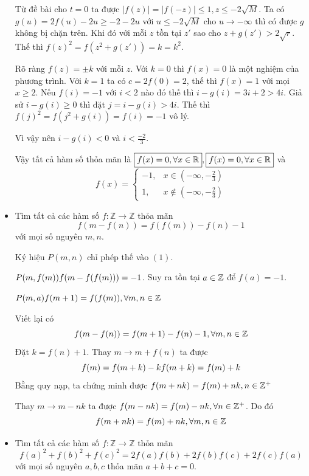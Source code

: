 \documentclass[11pt]{scrartcl}
\begin{document}
\begin{itemize}[label=, leftmargin=0em, itemsep=0.5em]
\begin{sol}
        Từ đề bài cho $t = 0$ ta được $|f(z)| = |f(-z)| \leq 1, z \leq -2\sqrt{M}$. Ta có $g(u) = 2f(u) - 2u \geq - 2-2u$ với $u \leq -2\sqrt{M}$ cho $u \to -\infty$ thì có được $g$ không bị chặn trên. Khi đó với mỗi $z$ tồn tại $z'$ sao cho $z + g(z') > 2\sqrt{r}$. Thế thì $f(z)^2 = f(z^2 + g(z')) = k = k^2$. 
        
        Rõ ràng $f(z) = \pm k$ với mỗi $z$. Với $k = 0$ thì $f(x) = 0$ là một nghiệm của phương trình. Với $k = 1$ ta có $c = 2f(0) = 2$, thế thì $f(x) = 1$ với mọi $x \geq 2$. Nếu $f(i) = - 1$ với $i < 2$ nào đó thế thì $i - g(i) = 3i + 2> 4i$. Giả sử $i - g(i) \geq 0$ thì đặt $j = i -g(i) > 4i$. Thế thì $f(j)^2 = f(j^2 + g(i)) = f(i) = -1$ vô lý. 
        
        Vì vậy nên $i - g(i) < 0$ và $i < \frac{-2}{3}$. 
        
        Vậy tất cả hàm số thỏa mãn là $\boxed{f(x) = 0 ,\forall x\in \mathbb{R}}, \boxed{f(x) = 0 ,\forall x\in \mathbb{R}}$ và 
        \[\boxed{ f(x)=
        \left\{\begin{array}{rr}-1,&x\in \left(-\infty,-\frac{2}{3}\right)\\
            1,&x\not\in \left(-\infty,-\frac{2}{3}\right)
        \end{array}
        \right.
        }
        \]
    \end{sol}
    \item \begin{bt}
        Tìm tất cả các hàm số $f: \mathbb{Z}\to \mathbb{Z}$ thỏa mãn
        \[
           f(m - f(n))  = f(f( m)) - f(n) -1\tag{1}
        \]
        với mọi số nguyên $m,n$.
    \end{bt}
    \begin{sol}
        Ký hiệu $P(m,n)$ chỉ phép thế vào $(1)$. 

        $P(m,f(m)) \ra f(m - f(f(m))) = -1$. Suy ra tồn tại $a \in \mathbb{Z}$ để $f(a) = -1$. 

        $P(m,a) \ra f(m + 1) = f(f(m)),\forall m,n\in \bb{Z}$

        Viết lại có 
        \[
            f(m - f(n)) = f( m + 1) -f(n) - 1, \forall m,n \in \mathbb{Z}
        \]
        Đặt $k = f(n) + 1$. Thay $m \to m + f(n)$ ta được 
        \[
            f(m) =  f(m + k) -k \lra f(m + k) = f(m) +k
        \]
        Bằng quy nạp, ta chứng minh được $f(m + nk) = f(m) + nk, n \in \mathbb{Z^+}$

        Thay $m \to m - nk$ ta được $f(m - nk) = f(m) - nk, \forall n \in \mathbb{Z^+}$. Do đó 
        \[
            f(m + nk) = f(m) + nk, \forall m,n \in \mathbb{Z}
        \]
    \end{sol}
    \item \begin{bt}
        Tìm tất cả các hàm số $f: \mathbb{Z} \to \mathbb{Z}$ thỏa mãn
        \[
          f(a)^2 + f(b)^2 + f(c)^2 = 2f(a)f(b) + 2f(b)f(c) + 2f(c)f(a)
        \]
        với mọi số nguyên $a,b,c$ thỏa mãn $a + b + c = 0$.
    \end{bt}
    

\end{itemize}
\end{document}
